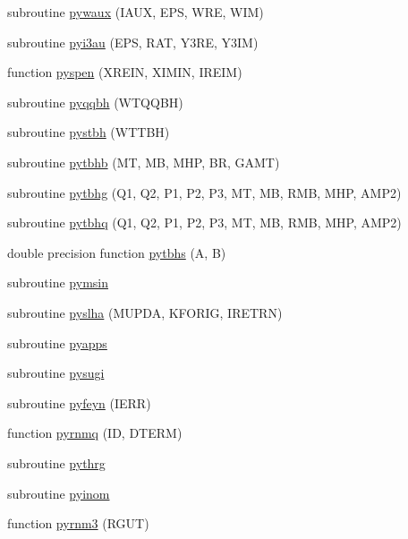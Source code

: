 \begin{DoxyCompactItemize}
subroutine \hyperlink{pythia-6_84_824_8f_ae73ad40757f6c2497e6197d50a19901e}{pywaux} (I\+A\+UX, E\+PS, W\+RE, W\+IM)
\item 
subroutine \hyperlink{pythia-6_84_824_8f_ac186b931cca6ec24614b06ac135af2f1}{pyi3au} (E\+PS, R\+AT, Y3\+RE, Y3\+IM)
\item 
function \hyperlink{pythia-6_84_824_8f_a07b33954bdfe77b2cd3634a4c6fbd989}{pyspen} (X\+R\+E\+IN, X\+I\+M\+IN, I\+R\+E\+IM)
\item 
subroutine \hyperlink{pythia-6_84_824_8f_a958f5064a30376ef7cc637b527bd2a32}{pyqqbh} (W\+T\+Q\+Q\+BH)
\item 
subroutine \hyperlink{pythia-6_84_824_8f_a8e204cdd8fb7ba8d843c00f6da2ec7e9}{pystbh} (W\+T\+T\+BH)
\item 
subroutine \hyperlink{pythia-6_84_824_8f_af4c86fb70caec2eba026ee2c81af861f}{pytbhb} (MT, MB, M\+HP, BR, G\+A\+MT)
\item 
subroutine \hyperlink{pythia-6_84_824_8f_ab37c75f11d388ab995e98e3eca29e81b}{pytbhg} (Q1, Q2, P1, P2, P3, MT, MB, R\+MB, M\+HP, A\+M\+P2)
\item 
subroutine \hyperlink{pythia-6_84_824_8f_a8d44a8d8b3450950fbf946b1c29fb42d}{pytbhq} (Q1, Q2, P1, P2, P3, MT, MB, R\+MB, M\+HP, A\+M\+P2)
\item 
double precision function \hyperlink{pythia-6_84_824_8f_a3fdb9651ba9fba9a91b74a416c48747b}{pytbhs} (A, B)
\item 
subroutine \hyperlink{pythia-6_84_824_8f_a27a2354cb3c8dc0f2fd65bc366f1cad9}{pymsin}
\item 
subroutine \hyperlink{pythia-6_84_824_8f_a424b8829609278da2e93ca1bc93b36be}{pyslha} (M\+U\+P\+DA, K\+F\+O\+R\+IG, I\+R\+E\+T\+RN)
\item 
subroutine \hyperlink{pythia-6_84_824_8f_a1420c8865333d41abeeecac9eb84d5ad}{pyapps}
\item 
subroutine \hyperlink{pythia-6_84_824_8f_ae48eb2702adff3d4d4b56689fde89d3c}{pysugi}
\item 
subroutine \hyperlink{pythia-6_84_824_8f_aa5b7f6282512d1ea3619a2d6061c68ce}{pyfeyn} (I\+E\+RR)
\item 
function \hyperlink{pythia-6_84_824_8f_ab299461aa924b8fbcdf024c6208aca16}{pyrnmq} (ID, D\+T\+E\+RM)
\item 
subroutine \hyperlink{pythia-6_84_824_8f_ae158d47b60e51c8ce75393f8688541f5}{pythrg}
\item 
subroutine \hyperlink{pythia-6_84_824_8f_aa7bdd8484862c65022c351660e12f59f}{pyinom}
\item 
function \hyperlink{pythia-6_84_824_8f_a705b41dadabcda252bc3016ab7637a1c}{pyrnm3} (R\+G\+UT)

\end{DoxyCompactItemize}
